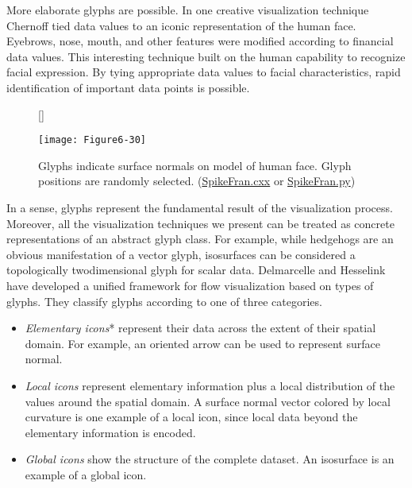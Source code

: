 More elaborate glyphs are possible. In one creative visualization technique Chernoff \cite{Chernoff73} tied data values to an iconic representation of the human face. Eyebrows, nose, mouth, and other features were modified according to financial data values. This interesting technique built on the human capability to recognize facial expression. By tying appropriate data values to facial characteristics, rapid identification of important data points is possible.

\begin{figure}[!htb]
	[\FBwidth]
	{\caption{Glyphs indicate surface normals on model of human face. Glyph positions are randomly selected. (\href{https://lorensen.github.io/VTKExamples/site/Cxx/VisualizationAlgorithms/SpikeFran/}{SpikeFran.cxx} or \href{https://lorensen.github.io/VTKExamples/site/Python/VisualizationAlgorithms/SpikeFran/}{SpikeFran.py})}\label{fig:Figure6-30}}
	{\texttt{[image: Figure6-30]}}
\end{figure}

In a sense, glyphs represent the fundamental result of the visualization process. Moreover, all the visualization techniques we present can be treated as concrete representations of an abstract glyph class. For example, while hedgehogs are an obvious manifestation of a vector glyph, isosurfaces can be considered a topologically twodimensional glyph for scalar data. Delmarcelle and Hesselink \cite{Delmarcelle95} have developed a unified framework for flow visualization based on types of glyphs. They classify glyphs according to one of three categories.

\begin{itemize}

\item \emph{Elementary icons}* represent their data across the extent of their spatial domain. For example, an oriented arrow can be used to represent surface normal.

\item \emph{Local icons} represent elementary information plus a local distribution of the values around the spatial domain. A surface normal vector colored by local curvature is one example of a local icon, since local data beyond the elementary information is encoded.

\item \emph{Global icons} show the structure of the complete dataset. An isosurface is an example of a global icon.

\end{itemize}

